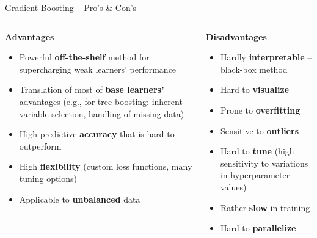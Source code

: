 \documentclass[11pt,compress,t,notes=noshow, xcolor=table]{beamer}
\newcommand{\highlight}[1]{\textcolor{highlightcol}{\textbf{#1}}}
\newcommand{\positem}{\item[$\highlight{+}$]}
\newcommand{\negitem}{\item[$\highlight{-}$]}
\begin{document}
\begin{frame}{Gradient Boosting -- Pro's \& Con's}

\footnotesize

\begin{columns}[onlytextwidth]
  \begin{column}{0.5\textwidth}
    \highlight{Advantages}
    \footnotesize
    \begin{itemize}
      \positem Powerful \textbf{off-the-shelf} method for supercharging weak 
      learners' performance
      \positem Translation of most of \textbf{base learners'} advantages 
      (e.g., for tree boosting: inherent 
      variable selection, handling of missing data)
      \positem High predictive \textbf{accuracy} that is hard to outperform
      \positem High \textbf{flexibility} (custom loss functions, many tuning 
      options) 
      \positem Applicable to \textbf{unbalanced} data
    \end{itemize}
  \end{column}
  \begin{column}{0.5\textwidth}
    \highlight{Disadvantages}
    \footnotesize
    \begin{itemize}
      \negitem Hardly \textbf{interpretable} -- black-box method
      \negitem Hard to \textbf{visualize}
      \negitem Prone to \textbf{overfitting}
      \negitem Sensitive to \textbf{outliers}
      \negitem Hard to \textbf{tune} (high sensitivity to variations in 
      hyperparameter values)
      \negitem Rather \textbf{slow} in training
      \negitem Hard to \textbf{parallelize}
    \end{itemize}
  \end{column}
\end{columns}

\vfill

\small


\end{frame}

\end{document}
